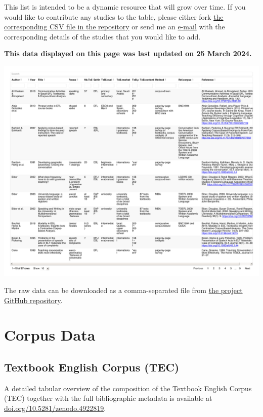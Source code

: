 \documentclass[
  letterpaper,
  DIV=11,
  numbers=noendperiod]{scrreprt}
\begin{document}
This list is intended to be a dynamic resource that will grow over time.
If you would like to contribute any studies to the table, please either
fork
\href{https://github.com/elenlefoll/TextbookEnglish/blob/main/LitReviewTable.csv}{the
corresponding CSV file in the repository} or send me an
\href{mailto:elefoll@uni-koeln.de?subject=\%5BLitReviewTable\%5D\%20Suggestions}{e-mail}
with the corresponding details of the studies that you would like to
add.

\textbf{This data displayed on this page was last updated on 25 March
2024.}

\includegraphics{AppendixA_files/figure-pdf/display-1.pdf}

The raw data can be downloaded as a comma-separated file from
\href{https://github.com/elenlefoll/TextbookMDA}{the project GitHub
repository}.

\chapter{Corpus Data}\label{corpus-data}

\section{Textbook English Corpus
(TEC)}\label{textbook-english-corpus-tec}

A detailed tabular overview of the composition of the Textbook English
Corpus (TEC) together with the full bibliographic metadata is available
at
\href{https://doi.org/10.5281/zenodo.4922819}{doi.org/10.5281/zenodo.4922819}.
\end{document}
